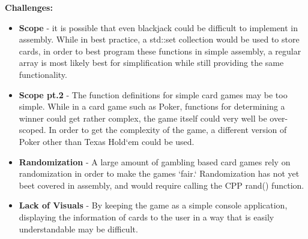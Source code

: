 \documentclass[twoside]{article}
\begin{document}
    \noindent \textbf{Challenges:}
    \begin{itemize}
        \item \textbf{Scope} - it is possible that even blackjack could be difficult to implement in assembly.
        While in best practice, a std::set collection would be used to store cards, in order to best program these functions in simple assembly, a regular array is most likely best for simplification while still providing the same functionality.
        \item \textbf{Scope pt.2} - The function definitions for simple card games may be too simple.
        While in a card game such as Poker, functions for determining a winner could get rather complex, the game itself could very well be over-scoped.
        In order to get the complexity of the game, a different version of Poker other than Texas Hold`em could be used.
        \item \textbf{Randomization} - A large amount of gambling based card games rely on randomization in order to make the games `fair.`
        Randomization has not yet beet covered in assembly, and would require calling the CPP rand() function.
        \item \textbf{Lack of Visuals} - By keeping the game as a simple console application, displaying the information of cards to the user in a way that is easily understandable may be difficult.
    \end{itemize}
\end{document}
